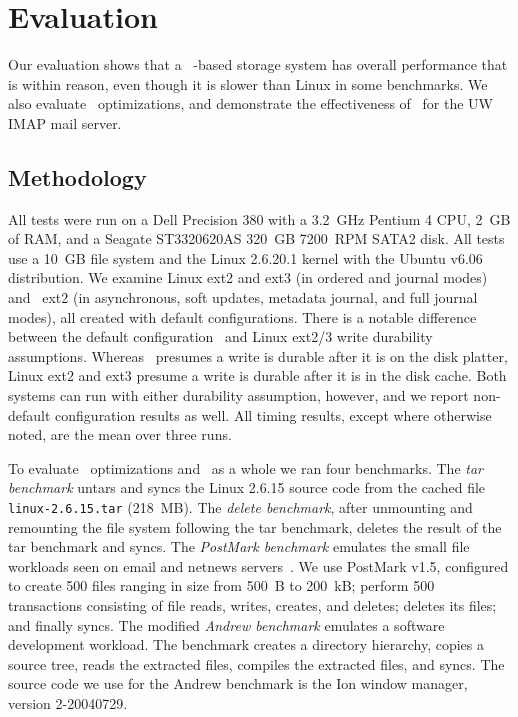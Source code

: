 \section {Evaluation}
\label{sec:evaluation}

Our evaluation shows that a \Kudos\ \patch-based storage system has
overall performance that is within reason, even though it is slower
than Linux in some benchmarks. We also evaluate \patch\ optimizations,
and demonstrate the effectiveness of \patchgroups\ for the UW IMAP
mail server.
%

\subsection{Methodology}

All tests were run on a Dell Precision 380 with a 3.2~GHz Pentium 4
CPU, 2~GB of RAM, and a Seagate ST3320620AS 320~GB 7200~RPM SATA2 disk.
%
All tests use a 10~GB file system and the Linux 2.6.20.1 kernel
with the Ubuntu v6.06 distribution.
%
We examine Linux ext2 and ext3 (in ordered and journal modes) and
\Kudos\ ext2 (in asynchronous, soft updates, metadata journal, and
full journal modes), all created with default configurations.
%
There is a notable difference between the default configuration
\Kudos\ and Linux ext2/3 write durability assumptions. Whereas \Kudos\
presumes a write is durable after it is on the disk platter, Linux
ext2 and ext3 presume a write is durable after it is in the disk
cache. Both systems can run with either durability assumption,
however, and we report non-default configuration results as well.
%
All timing results, except where otherwise noted, are the mean over three runs.

To evaluate \patch\ optimizations and \Kudos\ as a whole we ran four
benchmarks.
%
The \emph{tar benchmark} untars and syncs the Linux 2.6.15 source code
from the cached file \texttt{linux-2.6.15.tar} (218~MB).
%
The \emph{delete benchmark}, after unmounting and remounting the file
system following the tar benchmark, deletes the result of the tar
benchmark and syncs.
%
The \emph{PostMark benchmark} emulates the small file workloads seen
on email and netnews servers~\cite{postmark}. We use PostMark v1.5,
configured to create 500 files ranging in size from 500~B to 200~kB;
perform 500 transactions consisting of file reads, writes, creates,
and deletes; deletes its files; and finally syncs.
%
The modified \emph{Andrew benchmark} emulates a software development
workload.  The benchmark creates a directory hierarchy, copies a
source tree, reads the extracted files, compiles the extracted files,
and syncs. The source code we use for the Andrew benchmark is the Ion
window manager, version 2-20040729.

